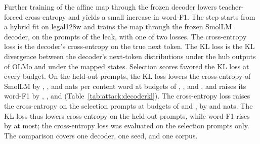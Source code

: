 Further training of the affine map through the frozen decoder lowers teacher-forced cross-entropy and yields a small increase in word-F1.
The step starts from a hybrid fit on legal128w and trains the map through the frozen SmolLM decoder, on the prompts of the leak, with one of two losses. %
The cross-entropy loss is the decoder's cross-entropy on the true next token.
The KL loss is the KL divergence between the decoder's next-token distributions under the hub outputs of OLMo and under the mapped states.
Selection scores favored the KL loss at every budget. %
On the  held-out prompts, the KL loss lowers the cross-entropy of SmolLM by , , and  nats per content word at budgets of , , and , and raises its word-F1 by , , and  (Table~\ref{tab:attack:decoderkl}). %
The cross-entropy loss raises the cross-entropy on the selection prompts at budgets of  and , by  and  nats. %
The KL loss thus lowers cross-entropy on the held-out prompts, while word-F1 rises by  at most; the cross-entropy loss was evaluated on the selection prompts only.
The comparison covers one decoder, one seed, and one corpus.


